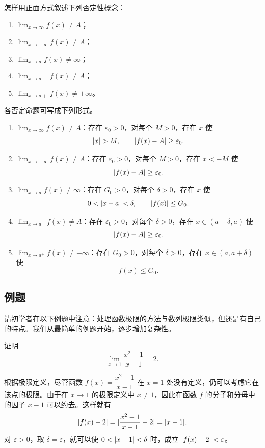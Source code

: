 \begin{xthought}[4]
怎样用正面方式叙述下列否定性概念：
  \begin{enumerate}[label=(\arabic*)]
    \item $\lim_{x\to\infty}f(x)\ne A$；
    \item $\lim_{x\to-\infty}f(x)\ne A$；
    \item $\lim_{x\to a}f(x)\ne\infty$；
    \item $\lim_{x\to a-}f(x)\ne A$；
    \item $\lim_{x\to a+}f(x)\ne+\infty$。
  \end{enumerate}
\end{xthought}
\begin{xsolution}
各否定命题可写成下列形式。
\begin{enumerate}[label=(\arabic*)]
  \item $\displaystyle\lim_{x\to\infty}f(x)\ne A$：存在 $\varepsilon_0>0$，对每个 $M>0$，存在 $x$ 使
  \[
    \lvert x\rvert>M,\qquad \lvert f(x)-A\rvert\geq\varepsilon_0.
  \]
  \item $\displaystyle\lim_{x\to-\infty}f(x)\ne A$：存在 $\varepsilon_0>0$，对每个 $M>0$，存在 $x<-M$ 使
  \[
    \lvert f(x)-A\rvert\geq\varepsilon_0.
  \]
  \item $\displaystyle\lim_{x\to a}f(x)\ne\infty$：存在 $G_0>0$，对每个 $\delta>0$，存在 $x$ 使
  \[
    0<\lvert x-a\rvert<\delta,\qquad \lvert f(x)\rvert\leq G_0.
  \]
  \item $\displaystyle\lim_{x\to a^-}f(x)\ne A$：存在 $\varepsilon_0>0$，对每个 $\delta>0$，存在
  $x\in(a-\delta,a)$ 使
  \[
    \lvert f(x)-A\rvert\geq\varepsilon_0.
  \]
  \item $\displaystyle\lim_{x\to a^+}f(x)\ne+\infty$：存在 $G_0>0$，对每个 $\delta>0$，存在
  $x\in(a,a+\delta)$ 使
  \[
    f(x)\leq G_0.
  \]
\end{enumerate}
\end{xsolution}


\subsection{例题}

请初学者在以下例题中注意：处理函数极限的方法与数列极限类似，但还是有自己的特点。我们从最简单的例题开始，逐步增加复杂性。

\begin{xexample}[4.1.1]
证明
\[
  \lim_{x\to1}\frac{x^2-1}{x-1}=2.
\]
\end{xexample}
\begin{xproof}
根据极限定义，尽管函数 $f(x)=\dfrac{x^2-1}{x-1}$ 在 $x=1$ 处没有定义，仍可以考虑它在该点的极限。由于在 $x\to1$ 的极限定义中 $x\ne1$，因此在函数 $f$ 的分子和分母中的因子 $x-1$ 可以约去。这样就有
\[
  \lvert f(x)-2\rvert=\lvert\frac{x^2-1}{x-1}-2\rvert=\lvert x-1\rvert.
\]
对 $\varepsilon>0$，取 $\delta=\varepsilon$，就可以使 $0<\lvert x-1\rvert<\delta$ 时，成立 $\lvert f(x)-2\rvert<\varepsilon$。
\end{xproof}

